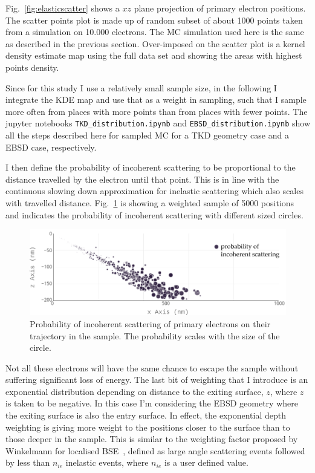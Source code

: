 Fig.~\ref{fig:elasticscatter} shows a $xz$ plane projection of primary electron positions. The scatter points plot is made up of random subset of about 1000 points taken from a simulation on 10.000 electrons. The MC simulation used here is the same as described in the previous section. Over-imposed on the scatter plot is a kernel density estimate map using the full data set and showing the areas with highest points density. 




Since for this study I use a relatively small sample size, in the following I integrate the KDE map and  use that as a weight in sampling, such that I sample more often from places with more points than from places with fewer points.  The jupyter notebooks \texttt{TKD\_distribution.ipynb} and \texttt{EBSD\_distribution.ipynb} show all the steps described here for sampled MC for a TKD geometry case and a EBSD case, respectively.

I then define the probability of incoherent scattering to be proportional to the distance travelled by the electron until that point. This is in line with the continuous slowing down approximation for inelastic scattering which also scales with travelled distance. Fig.~\ref{fig:incoherentscatter} is showing a weighted sample of 5000 positions and indicates the probability of incoherent scattering with different sized circles.


\begin{figure}[ht]
\centering
\includegraphics[width=5.8in]{Figures/incoherentscatter.png}
\caption[Incoherent scatter probability.]{Probability of incoherent scattering of primary electrons on their trajectory in the sample. The probability scales with the size of the circle.  }
\label{fig:incoherentscatter}
\end{figure}

Not all these electrons will have the same chance to escape the sample without suffering significant loss of energy. The last bit of weighting that I introduce is an exponential distribution depending on distance to the exiting surface, $z$, where $z$ is taken to be negative. In this case I'm considering the EBSD geometry where the exiting surface is also the entry surface. In effect, the exponential depth weighting is giving more weight to the positions closer to the surface than to those deeper in the sample. This is similar to the weighting factor proposed by Winkelmann \etal for localised BSE~\cite{Winkelmann13}, defined as large angle scattering events followed by less than $n_{ie}$ inelastic events, where $n_{ie}$ is a user defined value.

